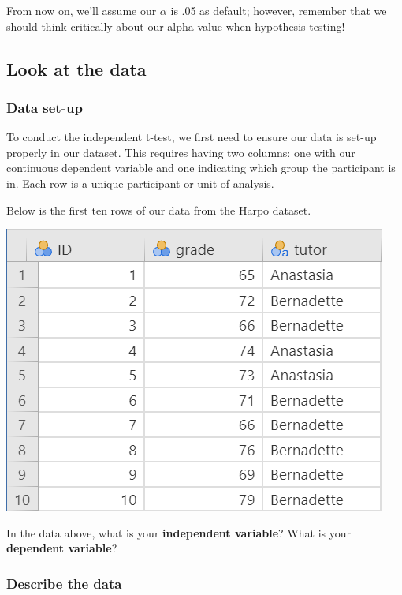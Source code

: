 \documentclass[
]{book}
\begin{document}
From now on, we'll assume our \(\alpha\) is .05 as default; however, remember that we should think critically about our alpha value when hypothesis testing!

\hypertarget{look-at-the-data-1}{%
\subsection{Look at the data}\label{look-at-the-data-1}}

\hypertarget{data-set-up-1}{%
\subsubsection{Data set-up}\label{data-set-up-1}}

To conduct the independent t-test, we first need to ensure our data is set-up properly in our dataset. This requires having two columns: one with our continuous dependent variable and one indicating which group the participant is in. Each row is a unique participant or unit of analysis.

Below is the first ten rows of our data from the Harpo dataset.

\includegraphics{images/02-independent_t-test/independent_t-test_data.png}

In the data above, what is your \textbf{independent variable}? What is your \textbf{dependent variable}?

\hypertarget{describe-the-data-1}{%
\subsubsection{Describe the data}\label{describe-the-data-1}}
\end{document}
